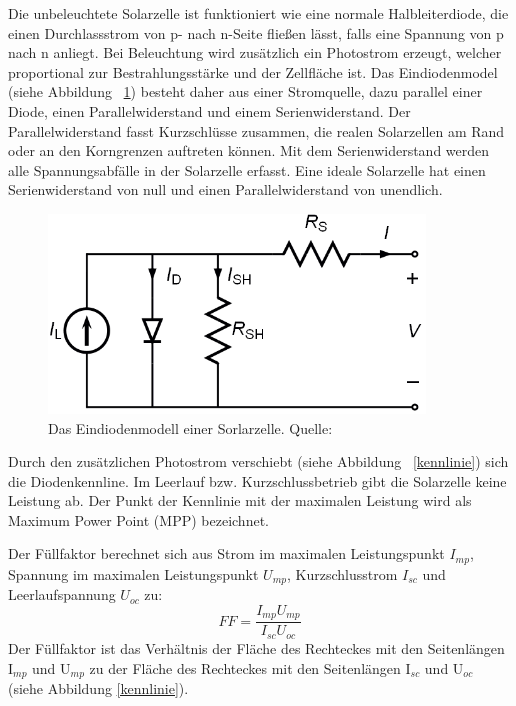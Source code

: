 \documentclass[a4paper,bibtotoc,oneside]{scrbook}
\begin{document}
Die unbeleuchtete Solarzelle ist funktioniert wie eine normale Halbleiterdiode, die einen Durchlassstrom von p- nach n-Seite fließen lässt, falls eine Spannung von p nach n anliegt. Bei Beleuchtung wird zusätzlich ein Photostrom erzeugt, welcher proportional zur Bestrahlungsstärke und der Zellfläche ist. Das Eindiodenmodel (siehe Abbildung ~\ref{esb}) besteht daher aus einer Stromquelle, dazu parallel einer Diode, einen Parallelwiderstand und einem Serienwiderstand. Der Parallelwiderstand fasst Kurzschlüsse zusammen, die realen Solarzellen am Rand oder an den Korngrenzen auftreten können. Mit dem Serienwiderstand werden alle Spannungsabfälle in der Solarzelle erfasst. Eine ideale Solarzelle hat einen Serienwiderstand von null und einen Parallelwiderstand von unendlich. 
\begin{figure}[htbp]
\centering
\includegraphics[width=100mm]{img/esb.png}
\caption{Das Eindiodenmodell einer Sorlarzelle. Quelle: \cite{esb}}\label{esb}
\end{figure}

Durch den zusätzlichen Photostrom verschiebt (siehe Abbildung ~\ref{kennlinie}) sich die Diodenkennline. Im Leerlauf  bzw. Kurzschlussbetrieb gibt die Solarzelle keine Leistung ab. Der Punkt der Kennlinie mit der maximalen Leistung wird als Maximum Power Point (MPP) bezeichnet.

Der Füllfaktor berechnet sich aus Strom im maximalen Leistungspunkt $I_{mp}$, Spannung im maximalen Leistungspunkt $U_{mp}$, Kurzschlusstrom $I_{sc}$ und Leerlaufspannung $U_{oc}$ zu:
  \begin{equation}
     FF = \frac {I_{mp} U_{mp}} {I_{sc} U_{oc}}
  \end{equation}
Der Füllfaktor ist das Verhältnis der Fläche des Rechteckes mit den Seitenlängen I$_{mp}$ und U$_{mp}$ zu der Fläche des Rechteckes mit den Seitenlängen I$_{sc}$ und U$_{oc}$ (siehe Abbildung \ref{kennlinie}).
\end{document}
